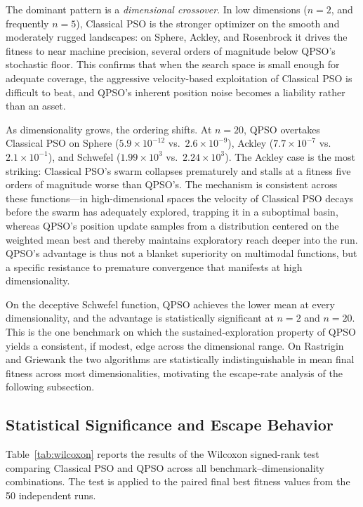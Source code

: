 The dominant pattern is a \emph{dimensional crossover}. In low dimensions ($n = 2$, and frequently $n = 5$), Classical PSO is the stronger optimizer on the smooth and moderately rugged landscapes: on Sphere, Ackley, and Rosenbrock it drives the fitness to near machine precision, several orders of magnitude below QPSO's stochastic floor. This confirms that when the search space is small enough for adequate coverage, the aggressive velocity-based exploitation of Classical PSO is difficult to beat, and QPSO's inherent position noise becomes a liability rather than an asset.

As dimensionality grows, the ordering shifts. At $n = 20$, QPSO overtakes Classical PSO on Sphere ($5.9 \times 10^{-12}$ vs.\ $2.6 \times 10^{-9}$), Ackley ($7.7 \times 10^{-7}$ vs.\ $2.1 \times 10^{-1}$), and Schwefel ($1.99 \times 10^{3}$ vs.\ $2.24 \times 10^{3}$). The Ackley case is the most striking: Classical PSO's swarm collapses prematurely and stalls at a fitness five orders of magnitude worse than QPSO's. The mechanism is consistent across these functions---in high-dimensional spaces the velocity of Classical PSO decays before the swarm has adequately explored, trapping it in a suboptimal basin, whereas QPSO's position update samples from a distribution centered on the weighted mean best and thereby maintains exploratory reach deeper into the run. QPSO's advantage is thus not a blanket superiority on multimodal functions, but a specific resistance to premature convergence that manifests at high dimensionality.

On the deceptive Schwefel function, QPSO achieves the lower mean at every dimensionality, and the advantage is statistically significant at $n = 2$ and $n = 20$. This is the one benchmark on which the sustained-exploration property of QPSO yields a consistent, if modest, edge across the dimensional range. On Rastrigin and Griewank the two algorithms are statistically indistinguishable in mean final fitness across most dimensionalities, motivating the escape-rate analysis of the following subsection.

\subsection{Statistical Significance and Escape Behavior}
\label{subsec:significance}

Table~\ref{tab:wilcoxon} reports the results of the Wilcoxon signed-rank test comparing Classical PSO and QPSO across all benchmark--dimensionality combinations. The test is applied to the paired final best fitness values from the 50 independent runs.

